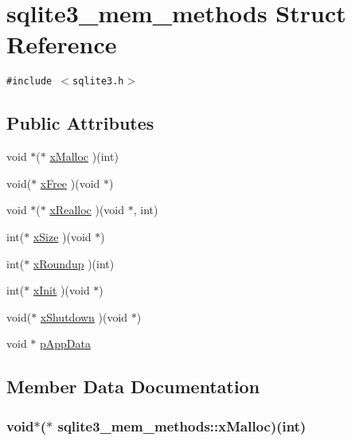 \hypertarget{structsqlite3__mem__methods}{
\section{sqlite3\_\-mem\_\-methods Struct Reference}
\label{structsqlite3__mem__methods}
}
{\tt \#include $<$sqlite3.h$>$}

\subsection*{Public Attributes}
\begin{CompactItemize}
\item 
void $\ast$($\ast$ \hyperlink{structsqlite3__mem__methods_896362a5dbd091b81ee74a852015e495}{xMalloc} )(int)
\item 
void($\ast$ \hyperlink{structsqlite3__mem__methods_a2e7fe8d030adaa17fd23a44fec1eca1}{xFree} )(void $\ast$)
\item 
void $\ast$($\ast$ \hyperlink{structsqlite3__mem__methods_53084ccc58abc9e02ef662e4f5bc2963}{xRealloc} )(void $\ast$, int)
\item 
int($\ast$ \hyperlink{structsqlite3__mem__methods_6c68275b577d66ae659ef30344c8f86c}{xSize} )(void $\ast$)
\item 
int($\ast$ \hyperlink{structsqlite3__mem__methods_8b3f0d1ddeb498c4aaf9bbce5b92a268}{xRoundup} )(int)
\item 
int($\ast$ \hyperlink{structsqlite3__mem__methods_d0997b548928358d655000b6ac825cf4}{xInit} )(void $\ast$)
\item 
void($\ast$ \hyperlink{structsqlite3__mem__methods_6f48100692bd935d7f3dbb8c701ab6ca}{xShutdown} )(void $\ast$)
\item 
void $\ast$ \hyperlink{structsqlite3__mem__methods_390f66d08d5a480544e919f64d7713de}{pAppData}
\end{CompactItemize}


\subsection{Member Data Documentation}
\hypertarget{structsqlite3__mem__methods_896362a5dbd091b81ee74a852015e495}{
\subsubsection[xMalloc]{\setlength{\rightskip}{0pt plus 5cm}void$\ast$($\ast$ {\bf sqlite3\_\-mem\_\-methods::xMalloc})(int)}}
\label{structsqlite3__mem__methods_896362a5dbd091b81ee74a852015e495}


